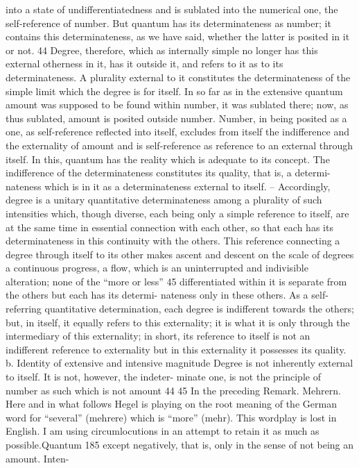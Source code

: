 into a state of undifferentiatedness and is sublated into the numerical
one, the self-reference of number. But quantum has its determinateness as
number; it contains this determinateness, as we have said, whether the latter
is posited in it or not. 44 Degree, therefore, which as internally simple no
longer has this external otherness in it, has it outside it, and refers to it as to its
determinateness. A plurality external to it constitutes the determinateness
of the simple limit which the degree is for itself. In so far as in the extensive
quantum amount was supposed to be found within number, it was sublated
there; now, as thus sublated, amount is posited outside number. Number,
in being posited as a one, as self-reference reflected into itself, excludes from
itself the indifference and the externality of amount and is self-reference as
reference to an external through itself.
In this, quantum has the reality which is adequate to its concept. The
indifference of the determinateness constitutes its quality, that is, a determi-
nateness which is in it as a determinateness external to itself. – Accordingly,
degree is a unitary quantitative determinateness among a plurality of such
intensities which, though diverse, each being only a simple reference to
itself, are at the same time in essential connection with each other, so
that each has its determinateness in this continuity with the others. This
reference connecting a degree through itself to its other makes ascent and
descent on the scale of degrees a continuous progress, a flow, which is
an uninterrupted and indivisible alteration; none of the “more or less” 45
differentiated within it is separate from the others but each has its determi-
nateness only in these others. As a self-referring quantitative determination,
each degree is indifferent towards the others; but, in itself, it equally refers
to this externality; it is what it is only through the intermediary of this
externality; in short, its reference to itself is not an indifferent reference to
externality but in this externality it possesses its quality.
b. Identity of extensive and intensive magnitude
Degree is not inherently external to itself. It is not, however, the indeter-
minate one, is not the principle of number as such which is not amount
44
45
In the preceding Remark.
Mehrern. Here and in what follows Hegel is playing on the root meaning of the German word
for “several” (mehrere) which is “more” (mehr). This wordplay is lost in English. I am using
circumlocutions in an attempt to retain it as much as possible.Quantum
185
except negatively, that is, only in the sense of not being an amount. Inten-
